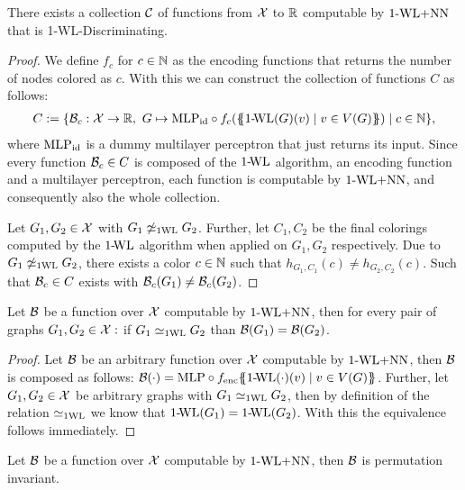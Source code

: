 \begin{lemma}\label{lem:wl_disc_exists}
    There exists a collection $\mathcal{C}$ of functions from $\mathcal{X}$ to $\mathbb{R}$ computable by $\text{1-WL+NN}$ that is 1-\!WL-Discriminating.
\end{lemma}

\begin{proof}
    We define $f_c$  for $c \in \mathbb{N}$ as the encoding functions that returns the number of nodes colored as $c$. With this we can construct the collection of functions $C$ as follows:
    \begin{align*}
        C := \{ \mathcal{B}_c: \mathcal{X} \rightarrow \mathbb{R}, \ G \mapsto \text{MLP}_\text{id} \circ f_c (\{\!\!\{ \text{1-\!WL}(G)(v) \mid v \in V(G) \}\!\!\}) \mid c \in \mathbb{N}\},
    \end{align*}
    where $\text{MLP}_\text{id}$ is a dummy multilayer perceptron that just returns its input. Since every function $\mathcal{B}_c \in C$ is composed of the $\text{1-\!WL}$ algorithm, an encoding function and a multilayer perceptron, each function is computable by $\text{1-WL+NN}$, and consequently also the whole collection.

    Let $G_1, G_2 \in \mathcal{X}$ with $G_1 \not\simeq_{\text{1WL}} G_2$. Further, let $C_1, C_2$ be the final colorings computed by the $\text{1-\!WL}$ algorithm when applied on $G_1, G_2$
    respectively. Due to $G_1 \not\simeq_{\text{1WL}} G_2$, there exists a color $c \in \mathbb{N}$ such that $h_{G_1,C_1}(c)  \neq h_{G_2,C_2}(c)$. Such that $\mathcal{B}_c \in C$ exists with $\mathcal{B}_c(G_1) \neq \mathcal{B}_c(G_2)$.
\end{proof}

\begin{lemma}\label{lem:wl_relation_equivalence}
    Let $\mathcal{B}$ be a function over $\mathcal{X}$ computable by $\text{1-WL+NN}$, then for every pair of graphs $G_1, G_2 \in \mathcal{X}:$ if $G_1 \simeq_{\text{1WL}} G_2$ than $\mathcal{B}(G_1) = \mathcal{B}(G_2)$.
\end{lemma}

\begin{proof}
    Let $\mathcal{B}$ be an arbitrary function over $\mathcal{X}$ computable by $\text{1-WL+NN}$, then $\mathcal{B}$ is composed as follows: $\mathcal{B}(\cdot) = \text{MLP} \circ f_{\text{enc}} \{\!\!\{ \text{1-\!WL}(\cdot)(v) \mid v \in V(G) \}\!\!\}$. Further, let $G_1, G_2 \in \mathcal{X}$ be arbitrary graphs with $G_1 \simeq_{\text{1WL}} G_2$, then by definition of the relation $\simeq_{\text{1WL}}$ we know that $\text{1-\!WL}(G_1) = \text{1-\!WL}(G_2)$. With this the equivalence follows immediately.
\end{proof}

\begin{lemma}\label{lem:wlnn_permutation_invariance}
    Let $\mathcal{B}$ be a function over $\mathcal{X}$ computable by $\text{1-WL+NN}$, then $\mathcal{B}$ is permutation invariant.
\end{lemma}

